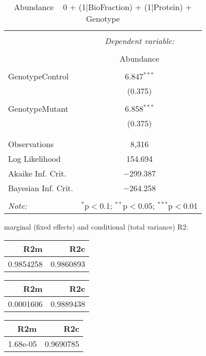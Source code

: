 \documentclass[11pt]{report}
\begin{document}
\begin{table}[!htbp] \centering 
  \caption{Abundance ~ 0 + (1|BioFraction) + (1|Protein) + Genotype} 
  \label{} 
\begin{tabular}{@{\extracolsep{5pt}}lc} 
\\[-1.8ex]\hline 
\hline \\[-1.8ex] 
 & \multicolumn{1}{c}{\textit{Dependent variable:}} \\ 
\cline{2-2} 
\\[-1.8ex] & Abundance \\ 
\hline \\[-1.8ex] 
 GenotypeControl & 6.847$^{***}$ \\ 
  & (0.375) \\ 
  & \\ 
 GenotypeMutant & 6.858$^{***}$ \\ 
  & (0.375) \\ 
  & \\ 
\hline \\[-1.8ex] 
Observations & 8,316 \\ 
Log Likelihood & 154.694 \\ 
Akaike Inf. Crit. & $-$299.387 \\ 
Bayesian Inf. Crit. & $-$264.258 \\ 
\hline 
\hline \\[-1.8ex] 
\textit{Note:}  & \multicolumn{1}{r}{$^{*}$p$<$0.1; $^{**}$p$<$0.05; $^{***}$p$<$0.01} \\ 
\end{tabular} 
\end{table} 
marginal (fixed effects) and conditional (total variance) R2:

\begin{tabular}{r|r}
\hline
R2m & R2c\\
\hline
0.9854258 & 0.9860893\\
\hline
\end{tabular}

\begin{tabular}{r|r}
\hline
R2m & R2c\\
\hline
0.0001606 & 0.9889438\\
\hline
\end{tabular}

\begin{tabular}{r|r}
\hline
R2m & R2c\\
\hline
1.68e-05 & 0.9690785\\
\hline
\end{tabular}
\end{document}
